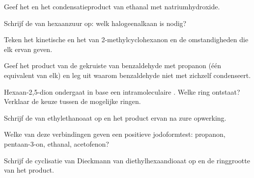 \begin{exercise}[$\star$]\label{exo:b2:enolates-aldol:3}
Geef het  en het condensatieproduct van ethanal met natriumhydroxide.
\end{exercise}

\begin{exercise}[$\star$]\label{exo:b2:enolates-aldol:4}
Schrijf de  van hexaanzuur op: welk halogeenalkaan is nodig?
\end{exercise}

\begin{exercise}[$\star\star$]\label{exo:b2:enolates-aldol:5}
Teken het kinetische en het  van 2-methylcyclohexanon en de omstandigheden die
elk ervan geven.
\end{exercise}

\begin{exercise}[$\star\star$]\label{exo:b2:enolates-aldol:6}
Geef het product van de gekruiste  van benzaldehyde met propanon (één equivalent
van elk) en leg uit waarom benzaldehyde niet met zichzelf condenseert.
\end{exercise}

\begin{exercise}[$\star\star$]\label{exo:b2:enolates-aldol:7}
Hexaan-2,5-dion ondergaat in base een intramoleculaire . Welke ring ontstaat? Verklaar de
keuze tussen de mogelijke ringen.
\end{exercise}

\begin{exercise}[$\star\star$]\label{exo:b2:enolates-aldol:8}
Schrijf de  van ethylethanoaat op en het product ervan na zure opwerking.
\end{exercise}

\begin{exercise}[$\star\star$]\label{exo:b2:enolates-aldol:9}
Welke van deze verbindingen geven een positieve jodoformtest: propanon, pentaan-3-on, ethanal, acetofenon?
\end{exercise}

\begin{exercise}[$\star\star\star$]\label{exo:b2:enolates-aldol:10}
Schrijf de cyclisatie van Dieckmann van diethylhexaandioaat op en de ringgrootte van het product.
\end{exercise}

